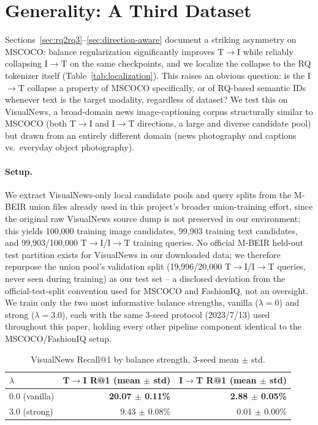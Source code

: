 \section{Generality: A Third Dataset}
\label{sec:generality}

Sections~\ref{sec:rq2rq3}--\ref{sec:direction-aware} document a striking asymmetry on MSCOCO: balance regularization significantly improves T$\to$I while reliably collapsing I$\to$T on the same checkpoints, and we localize the collapse to the RQ tokenizer itself (Table~\ref{tab:localization}). This raises an obvious question: is the I$\to$T collapse a property of MSCOCO specifically, or of RQ-based semantic IDs whenever text is the target modality, regardless of dataset? We test this on VisualNews, a broad-domain news image-captioning corpus structurally similar to MSCOCO (both T$\to$I and I$\to$T directions, a large and diverse candidate pool) but drawn from an entirely different domain (news photography and captions vs.\ everyday object photography).

\paragraph{Setup.} We extract VisualNews-only local candidate pools and query splits from the M-BEIR union files already used in this project's broader union-training effort, since the original raw VisualNews source dump is not preserved in our environment; this yields 100,000 training image candidates, 99,903 training text candidates, and 99,903/100,000 T$\to$I/I$\to$T training queries. No official M-BEIR held-out test partition exists for VisualNews in our downloaded data; we therefore repurpose the union pool's validation split (19,996/20,000 T$\to$I/I$\to$T queries, never seen during training) as our test set -- a disclosed deviation from the official-test-split convention used for MSCOCO and FashionIQ, not an oversight. We train only the two most informative balance strengths, vanilla ($\lambda=0$) and strong ($\lambda=3.0$), each with the same 3-seed protocol (2023/7/13) used throughout this paper, holding every other pipeline component identical to the MSCOCO/FashionIQ setup.

\begin{table}[t]
\centering
\caption{VisualNews Recall@1 by balance strength, 3-seed mean $\pm$ std.}
\label{tab:visualnews}
\footnotesize
\begin{tabular}{@{}lrr@{}}
\toprule
$\lambda$ & T$\to$I R@1 (mean $\pm$ std) & I$\to$T R@1 (mean $\pm$ std) \\
\midrule
0.0 (vanilla) & \textbf{20.07 $\pm$ 0.11\%} & \textbf{2.88 $\pm$ 0.05\%} \\
3.0 (strong)  & 9.43 $\pm$ 0.08\%  & 0.01 $\pm$ 0.00\% \\
\bottomrule
\end{tabular}
\end{table}

